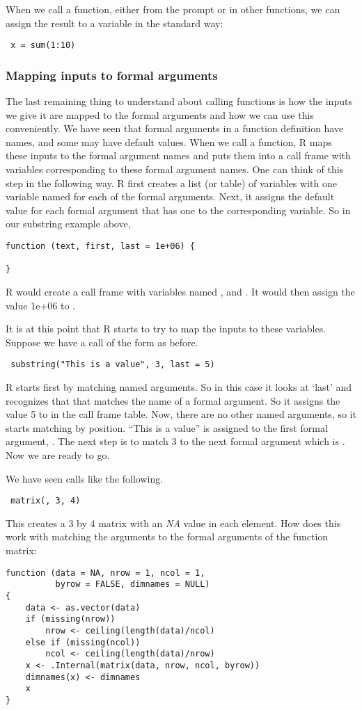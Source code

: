 {When we call a function, either from the prompt or in other functions,
we can assign the result to a variable in the standard way:
\begin{verbatim}
 x = sum(1:10)
\end{verbatim}

\subsubsection{Mapping inputs to formal arguments}
The last remaining thing to understand about calling functions is how
the inputs we give it are mapped to the formal arguments and how we
can use this conveniently. We have seen that formal arguments in a
function definition have names, and some may have default values. When
we call a function, R maps these inputs to the formal argument names
and puts them into a call frame with variables corresponding to these
formal argument names. One can think of this step in the following
way. R first creates a list (or table) of variables with one variable
named for each of the formal arguments. Next, it assigns the default
value for each formal argument that has one to the corresponding
variable. So in our substring example above,
\begin{verbatim}
function (text, first, last = 1e+06) {

}
\end{verbatim}
R would create a call frame with variables named ,
 and . It would then assign the value
1e+06 to .

It is at this point that R starts to try to map the inputs to these
variables. Suppose we have a call of the form as before.
\begin{verbatim}
 substring("This is a value", 3, last = 5)
\end{verbatim}
R starts first by matching named arguments. So in this case it looks
at `last' and recognizes that that matches the name of a formal
argument. So it assigns the value 5 to  in the call
frame table. Now, there are no other named arguments, so it starts
matching by position. ``This is a value'' is assigned to the first
formal argument, . The next step is to match 3 to the
next formal argument which is . Now we are ready to
go.

We have seen calls like the following.
\begin{verbatim}
 matrix(, 3, 4)
\end{verbatim}
This creates a 3 by 4 matrix with an \textit{NA} value in each
element. How does this work with matching the arguments to the formal
arguments of the function matrix:
\begin{verbatim}
function (data = NA, nrow = 1, ncol = 1, 
          byrow = FALSE, dimnames = NULL) 
{
    data <- as.vector(data)
    if (missing(nrow)) 
        nrow <- ceiling(length(data)/ncol)
    else if (missing(ncol)) 
        ncol <- ceiling(length(data)/nrow)
    x <- .Internal(matrix(data, nrow, ncol, byrow))
    dimnames(x) <- dimnames
    x
}
\end{verbatim}


}
